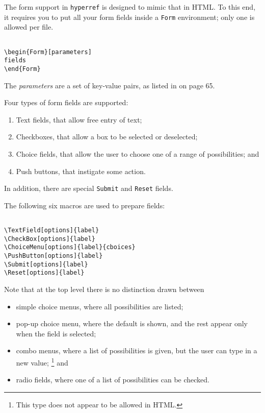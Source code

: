 The form support in \verb|hyperref|
is designed to mimic that in HTML. To this end, it requires you to put
all your form fields inside a \verb|Form| environment; only one is allowed per
file. 

\begin{verbatim}

\begin{Form}[parameters] 
fields 
\end{Form} 

\end{verbatim}


The \emph{parameters} are a set of key-value pairs, as listed in  on page 65. 

Four types of form fields are supported: 

\begin{enumerate}
  \item  Text fields, that allow free entry of text; 
  \item  Checkboxes, that allow a box to be selected or deselected; 
  \item  Choice fields, that allow the user to choose one of a range of possibilities; and 
  \item  Push buttons, that instigate some action. 
\end{enumerate}

In addition, there are special \verb|Submit| and \verb|Reset| fields. 

The following six macros are used to prepare fields: 

\begin{verbatim}

\TextField[options]{label}
\CheckBox[options]{label}
\ChoiceMenu[options]{label}{cboices}
\PushButton[options]{label}
\Submit[options]{label}
\Reset[options]{label}

\end{verbatim}


Note that at the top level there is no distinction drawn between 

\begin{itemize}
  \item simple choice menus, where all possibilities are listed; 
  \item pop-up choice menu, where the default is shown, and the rest appear only when 
    the field is selected; 
  \item combo menus, where a list of possibilities is given, but the user can type in a 
    new value; \footnote{This type does not appear to be allowed in HTML.} and
  \item radio fields, where one of a list of possibilities can be checked. 
\end{itemize}

